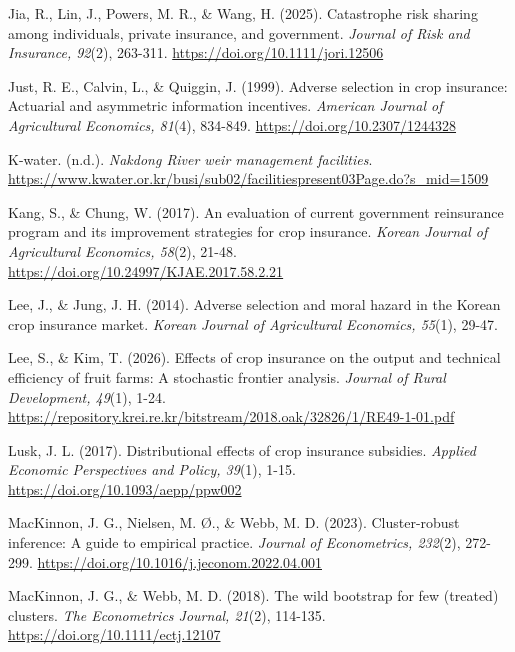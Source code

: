\begin{thebibliography}{}
Jia, R., Lin, J., Powers, M. R., \& Wang, H. (2025). Catastrophe risk sharing among individuals, private insurance, and government. \textit{Journal of Risk and Insurance, 92}(2), 263-311. \url{https://doi.org/10.1111/jori.12506}

Just, R. E., Calvin, L., \& Quiggin, J. (1999). Adverse selection in crop insurance: Actuarial and asymmetric information incentives. \textit{American Journal of Agricultural Economics, 81}(4), 834-849. \url{https://doi.org/10.2307/1244328}

K-water. (n.d.). \textit{Nakdong River weir management facilities}. \url{https://www.kwater.or.kr/busi/sub02/facilitiespresent03Page.do?s_mid=1509}

Kang, S., \& Chung, W. (2017). An evaluation of current government reinsurance program and its improvement strategies for crop insurance. \textit{Korean Journal of Agricultural Economics, 58}(2), 21-48. \url{https://doi.org/10.24997/KJAE.2017.58.2.21}

Lee, J., \& Jung, J. H. (2014). Adverse selection and moral hazard in the Korean crop insurance market. \textit{Korean Journal of Agricultural Economics, 55}(1), 29-47.

Lee, S., \& Kim, T. (2026). Effects of crop insurance on the output and technical efficiency of fruit farms: A stochastic frontier analysis. \textit{Journal of Rural Development, 49}(1), 1-24. \url{https://repository.krei.re.kr/bitstream/2018.oak/32826/1/RE49-1-01.pdf}

Lusk, J. L. (2017). Distributional effects of crop insurance subsidies. \textit{Applied Economic Perspectives and Policy, 39}(1), 1-15. \url{https://doi.org/10.1093/aepp/ppw002}

MacKinnon, J. G., Nielsen, M. Ø., \& Webb, M. D. (2023). Cluster-robust inference: A guide to empirical practice. \textit{Journal of Econometrics, 232}(2), 272-299. \url{https://doi.org/10.1016/j.jeconom.2022.04.001}

MacKinnon, J. G., \& Webb, M. D. (2018). The wild bootstrap for few (treated) clusters. \textit{The Econometrics Journal, 21}(2), 114-135. \url{https://doi.org/10.1111/ectj.12107}


\end{thebibliography}
